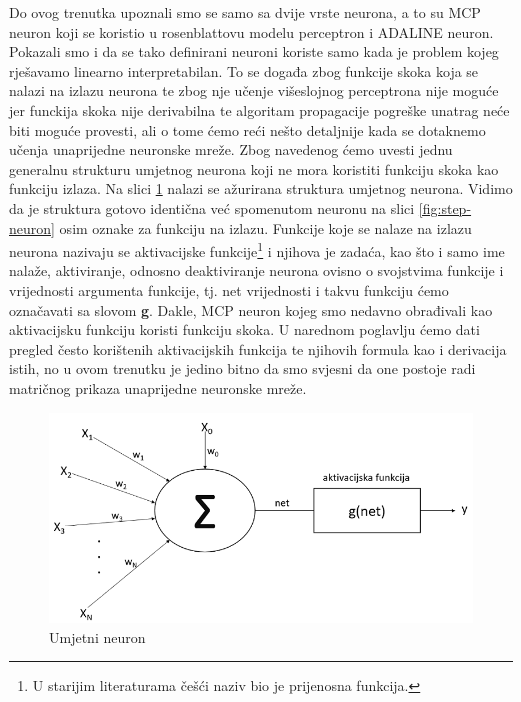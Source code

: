 \documentclass[times, utf8, zavrsni]{fer}
\begin{document}
Do ovog trenutka upoznali smo se samo sa dvije vrste neurona, a to su MCP neuron koji se koristio u rosenblattovu modelu perceptron i ADALINE neuron. Pokazali smo i da se tako definirani neuroni koriste samo kada je problem kojeg rješavamo linearno interpretabilan. To se događa zbog funkcije skoka koja se nalazi na izlazu neurona te zbog nje učenje višeslojnog perceptrona nije moguće jer funckija skoka nije derivabilna te algoritam propagacije pogreške unatrag neće biti moguće provesti, ali o tome ćemo reći nešto detaljnije kada se dotaknemo učenja unaprijedne neuronske mreže. Zbog navedenog ćemo uvesti jednu generalnu strukturu umjetnog neurona koji ne mora koristiti funkciju skoka kao funkciju izlaza. Na slici \ref{fig:ai-neuron} nalazi se ažurirana struktura umjetnog neurona. Vidimo da je struktura gotovo identična već spomenutom neuronu na slici \ref{fig:step-neuron} osim oznake za funkciju na izlazu. Funkcije koje se nalaze na izlazu neurona nazivaju se aktivacijske funkcije\footnote{U starijim literaturama češći naziv bio je prijenosna funkcija.} i njihova je zadaća, kao što i samo ime nalaže, aktiviranje, odnosno deaktiviranje neurona ovisno o svojstvima funkcije i vrijednosti argumenta funkcije, tj. net vrijednosti i takvu funkciju ćemo označavati sa slovom \textbf{g}. Dakle, MCP neuron kojeg smo nedavno obrađivali kao aktivacijsku funkciju koristi funkciju skoka. U narednom poglavlju ćemo dati pregled često korištenih aktivacijskih funkcija te njihovih formula kao i derivacija istih, no u ovom trenutku je jedino bitno da smo svjesni da one postoje radi matričnog prikaza unaprijedne neuronske mreže.

\begin{figure}[H]
    \centering
    \includegraphics[scale=0.6]{img/ai-neuron.png}
    \caption[Caption for LOF]{Umjetni neuron\footnotemark}
    \label{fig:ai-neuron}
\end{figure}
\end{document}
